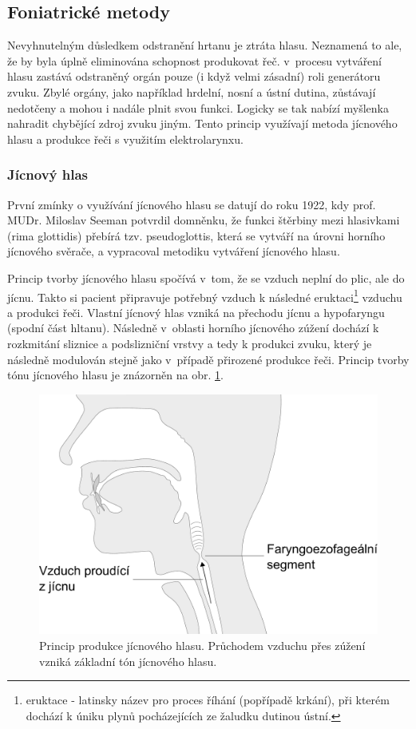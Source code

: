 \subsection{Foniatrické metody} %
\label{chap:cause:treatment:foniatric}

Nevyhnutelným důsledkem odstranění hrtanu je ztráta hlasu. Neznamená to ale, že by byla
úplně eliminována schopnost produkovat řeč. v~procesu vytváření hlasu zastává
odstraněný orgán pouze (i když velmi zásadní) roli generátoru zvuku. Zbylé
orgány, jako například hrdelní, nosní a ústní dutina, zůstávají nedotčeny a mohou i
nadále plnit svou funkci. Logicky se tak nabízí myšlenka nahradit chybějící
zdroj zvuku jiným. Tento princip využívají metoda jícnového hlasu a produkce řeči s využitím
elektrolarynxu.

\subsubsection{Jícnový hlas} %
\label{chap:cause:treatment:foniatric:esophageal}

První zmínky o využívání jícnového hlasu se datují do roku 1922, kdy prof. MUDr. Miloslav Seeman
\cite{seeman1922speech} potvrdil domněnku, že funkci štěrbiny mezi hlasivkami (rima
glottidis) přebírá tzv. pseudoglottis, která se vytváří na úrovni horního
jícnového svěrače, a vypracoval metodiku vytváření jícnového
hlasu.

Princip tvorby jícnového hlasu spočívá v~tom, že se vzduch neplní do plic, ale do jícnu.
Takto si pacient připravuje potřebný vzduch k následné
eruktaci\footnote{eruktace - latinsky název pro proces říhání (popřípadě
krkání), při kterém dochází k úniku plynů pocházejících ze žaludku dutinou
ústní.} vzduchu a produkci řeči. Vlastní jícnový hlas vzniká na přechodu
jícnu a hypofaryngu (spodní část hltanu). Následně v~oblasti horního jícnového
zúžení dochází k rozkmitání sliznice a podslizniční vrstvy a tedy k produkci zvuku,
který je následně modulován stejně jako v~případě přirozené produkce řeči.
Princip tvorby  tónu jícnového hlasu je znázorněn na obr.
\ref{fig:cause:treatment:esophageal}.

\begin{figure}[htb]
  \begin{center}
    \includegraphics[width=0.6\linewidth]{ch3-cause/figures/esophageal}
    \caption[Princip produkce jícnového hlasu.]{Princip produkce jícnového hlasu. Průchodem vzduchu přes zúžení vzniká základní tón jícnového hlasu.}
    \label{fig:cause:treatment:esophageal}
  \end{center}
\end{figure}


